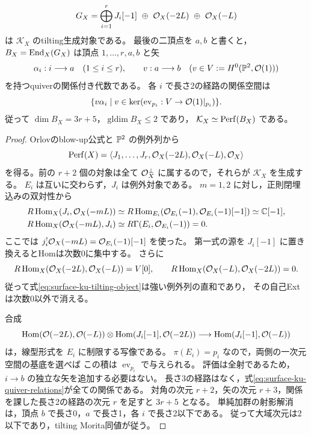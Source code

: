 \begin{proposition}[点配置代数による残余圏の表示]
\label{prop:surface-ku-tilting}
\begin{equation}\label{eq:surface-ku-tilting-object}
 G_X=\bigoplus_{i=1}^{r}J_i[-1]\ \oplus\ \OO_X(-2L)\ \oplus\ \OO_X(-L)
\end{equation}
は $\mathcal K_X$ のtilting生成対象である。
最後の二頂点を $a,b$ と書くと，
$B_X=\operatorname{End}_X(G_X)$ は頂点 $1,\ldots,r,a,b$ と矢
\[
 \alpha_i:i\longrightarrow a\quad(1\le i\le r),
 \qquad v:a\longrightarrow b\quad(v\in V:=H^0(\mathbb P^2,\mathcal O(1)))
\]
を持つquiverの関係付き代数である。
各 $i$ で長さ2の経路の関係空間は
\begin{equation}\label{eq:surface-ku-quiver-relations}
 \{v\alpha_i\mid v\in\ker(\operatorname{ev}_{p_i}:V\to\mathcal O(1)|_{p_i})\}.
\end{equation}
従って $\dim B_X=3r+5$，$\operatorname{gldim}B_X\le2$ であり，
$\mathcal K_X\simeq\operatorname{Perf}(B_X)$ である。
\end{proposition}

\begin{proof}
Orlovのblow-up公式\cite[Theorem~4.3]{OrlovBlowup1993}と $\mathbb P^2$ の例外列から
\[
 \operatorname{Perf}(X)=
 \langle J_1,\ldots,J_r,\mathcal O_X(-2L),\mathcal O_X(-L),\mathcal O_X\rangle
\]
を得る。前の $r+2$ 個の対象は全て $\mathcal O_X^\perp$ に属するので，それらが
$\mathcal K_X$ を生成する。
$E_i$ は互いに交わらず，$J_i$ は例外対象である。
$m=1,2$ に対し，正則閉埋込みの双対性から
\begin{align*}
 R\operatorname{Hom}_X(J_i,\mathcal O_X(-mL))
 &\simeq R\operatorname{Hom}_{E_i}
  (\mathcal O_{E_i}(-1),\mathcal O_{E_i}(-1)[-1])\simeq\mathbb C[-1],\\
 R\operatorname{Hom}_X(\mathcal O_X(-mL),J_i)
 &\simeq R\Gamma(E_i,\mathcal O_{E_i}(-1))=0.
\end{align*}
ここでは $j_i^!\mathcal O_X(-mL)=\mathcal O_{E_i}(-1)[-1]$ を使った。
第一式の源を $J_i[-1]$ に置き換えるとHomは次数0に集中する。
さらに
\[
 R\operatorname{Hom}_X(\mathcal O_X(-2L),\mathcal O_X(-L))=V[0],\qquad
 R\operatorname{Hom}_X(\mathcal O_X(-L),\mathcal O_X(-2L))=0.
\]
従って式\eqref{eq:surface-ku-tilting-object}は強い例外列の直和であり，
その自己Extは次数0以外で消える。

合成
\[
 \operatorname{Hom}(\mathcal O(-2L),\mathcal O(-L))\otimes\operatorname{Hom}(J_i[-1],\mathcal O(-2L))
 \longrightarrow\operatorname{Hom}(J_i[-1],\mathcal O(-L))
\]
は，線型形式を $E_i$ に制限する写像である。
$\pi(E_i)=p_i$ なので，両側の一次元空間の基底を選べば
この積は $\operatorname{ev}_{p_i}$ で与えられる。
評価は全射であるため，$i\to b$ の独立な矢を追加する必要はない。
長さ3の経路はなく，式\eqref{eq:surface-ku-quiver-relations}が全ての関係である。
対角の次元 $r+2$，矢の次元 $r+3$，関係を課した長さ2の経路の次元 $r$ を足すと
$3r+5$ となる。
単純加群の射影解消は，頂点 $b$ で長さ0，$a$ で長さ1，各 $i$ で長さ2以下である。
従って大域次元は2以下であり，tilting Morita同値が従う。
\end{proof}

